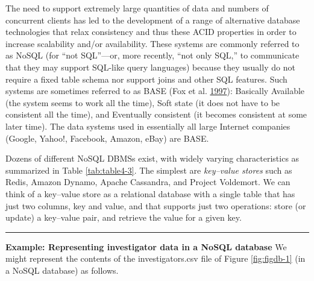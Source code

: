 \documentclass[]{krantz}
\begin{document}
The need to support extremely large quantities of data and numbers of
concurrent clients has led to the development of a range of alternative
database technologies that relax consistency and thus these ACID
properties in order to increase scalability and/or availability. These
systems are commonly referred to as NoSQL (for ``not SQL''---or, more
recently, ``not only SQL,'' to communicate that they may support
SQL-like query languages) because they usually do not require a fixed
table schema nor support joins and other SQL features. Such systems are
sometimes referred to as BASE (Fox et al.
\protect\hyperlink{ref-fox1997cluster}{1997}): Basically Available (the
system seems to work all the time), Soft state (it does not have to be
consistent all the time), and Eventually consistent (it becomes
consistent at some later time). The data systems used in essentially all
large Internet companies (Google, Yahoo!, Facebook, Amazon, eBay) are
BASE.

Dozens of different NoSQL DBMSs exist, with widely varying
characteristics as summarized in Table \ref{tab:table4-3}. The simplest
are \emph{key--value stores} such as Redis, Amazon Dynamo, Apache
Cassandra, and Project Voldemort. We can think of a key--value store as
a relational database with a single table that has just two columns, key
and value, and that supports just two operations: store (or update) a
key--value pair, and retrieve the value for a given key.

\begin{center}\rule{0.5\linewidth}{\linethickness}\end{center}

\textbf{Example: Representing investigator data in a NoSQL database} We
might represent the contents of the investigators.csv file of Figure
\ref{fig:figdb-1} (in a NoSQL database) as follows.
\end{document}
